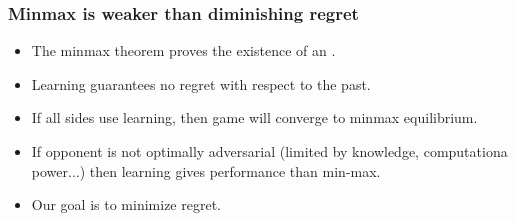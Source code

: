 \documentclass[handout]{beamer}
\begin{document}
\begin{frame}
\frametitle{Minmax is weaker than diminishing regret}
\begin{itemize}
\item The minmax theorem proves the existence of an .
\item Learning guarantees no regret with respect to the past.
\item If all sides use learning, then game will converge to minmax equilibrium.
\item If opponent is not optimally adversarial (limited by knowledge, computationa power...) then learning gives  performance than min-max.
\item Our goal is to minimize regret.
\end{itemize}
\end{frame}
\end{document}
